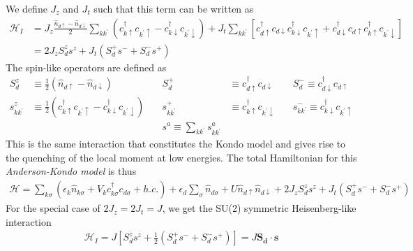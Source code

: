 \documentclass[twoside]{report}
\numberwithin{equation}{section}
\begin{document}
We define \(J_z\) and \(J_t\) such that this term can be written as
\begin{equation}\begin{aligned}
	\mathcal{H}_{I} &= J_z \frac{\hat n_{d\uparrow} - \hat n_{d\downarrow}}{2}\sum_{kk^\prime}\left(c^\dagger_{k\uparrow}c_{k^\prime\uparrow} - c^\dagger_{k\downarrow}c_{k^\prime\downarrow}\right) + J_t \sum_{kk^\prime}\left[ c^\dagger_{d\uparrow}c_{d\downarrow}c^\dagger_{k\downarrow}c_{k^\prime\uparrow} + c^\dagger_{d\downarrow}c_{d\uparrow}c^\dagger_{k\uparrow}c_{k^\prime\downarrow}\right]\\
			&= 2J_z S_d^z s^z + J_t \left(S_d^+ s^- + S_d^- s^+\right)
\end{aligned}\end{equation}
The spin-like operators are defined as
\begin{equation}\begin{aligned}
	S^z_d &\equiv \frac{1}{2}\left(\hat n_{d\uparrow} - \hat n_{d\downarrow}\right) \quad&S^+_d &\equiv c^\dagger_{d\uparrow}c_{d\downarrow}\quad &S^-_d \equiv c^\dagger_{d\downarrow}c_{d\uparrow}\\
	s^z_{kk^\prime} &\equiv \frac{1}{2}\left(c^\dagger_{k\uparrow}c_{k^\prime\uparrow} - c^\dagger_{k\downarrow}c_{k^\prime\downarrow}\right) \quad &s^+_{kk^\prime} &\equiv c^\dagger_{k\uparrow}c_{k^\prime\downarrow}\quad &s^-_{kk^\prime} \equiv c^\dagger_{k\downarrow}c_{k^\prime\uparrow}\\
        &&s^a \equiv \sum_{kk^\prime}s^a_{kk^\prime}
\end{aligned}\end{equation}
This is the same interaction that constitutes the Kondo model and gives rise to the quenching of the local moment at low energies. The total Hamiltonian for this \textit{Anderson-Kondo model} is thus
\begin{equation}\begin{aligned}
	\label{andham}
	\mathcal{H} = \sum_{k\sigma}\left(\epsilon_k \hat n_{k\sigma} + V_{k} c^\dagger_{k\sigma} c_{d\sigma} + h.c.\right) + \epsilon_{d}\sum_\sigma  \hat n_{d\sigma} +  U \hat n_{d\uparrow} \hat n_{d\downarrow} + 2J_z S_d^z s^z + J_t \left(S_d^+ s^- + S_d^- s^+\right)
\end{aligned}\end{equation}
For the special case of \(2J_z = 2J_t = J\), we get the SU(2) symmetric Heisenberg-like interaction
\begin{equation}\begin{aligned}
	\mathcal{H}_{I} = J \left[S^z_d s^z + \frac{1}{2}\left(S^+_d s^- + S^-_d s^+\right)\right] = J \mathbf{S_d} \cdot \mathbf{s}
\end{aligned}\end{equation}
\end{document}
